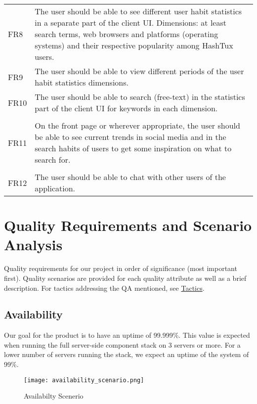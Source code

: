 {\tabulinesep=1.4mm
\begin{tabu}{|l|l|}
\hline
{}
 \\
\hline
\taburowcolors {}
FR8 & \parbox[t]{108mm}{The user should be able to see different user habit
   statistics in a separate part of the client UI. Dimensions: at least search
   terms, web browsers and platforms (operating systems) and their respective
   popularity among HashTux users.} \\
\hline
FR9 & \parbox[t]{108mm}{The user should be able to view different periods of the
   user habit statistics dimensions.} \\
\hline
FR10 & \parbox[t]{108mm}{The user should be able to search (free-text) in the
   statistics part of the client UI for keywords in each dimension.} \\
\hline
{}
  \\
\hline
\taburowcolors{}
FR11 & \parbox[t]{108mm}{On the front page or wherever appropriate, the user
   should be able to see current trends in social media and in the search habits
   of users to get some inspiration on what to search for.} \\
\hline
{}
   \\
\hline
\taburowcolors{}
FR12 & \parbox[t]{108mm}{The user should be able to chat with other users of the
   application.} \\
\hline
\end{tabu}}

\section{Quality Requirements and Scenario Analysis}
Quality requirements for our project in order of significance (most important
first). Quality scenarios are provided for each quality attribute as well as a
brief description. For tactics addressing the QA mentioned, see
\hyperlink{tactics}{Tactics}.

\subsection{Availability}
Our goal for the product is to have an uptime of 99.999\%. This value is
expected when running the full server-side component stack on 3 servers or more.
For a lower number of servers running the stack, we expect an uptime of the
system of 99\%.
\begin{figure}[ht]
  \centering
  \texttt{[image: availability\_scenario.png]}
  \caption{Availabilty Scenerio}
\end{figure}

